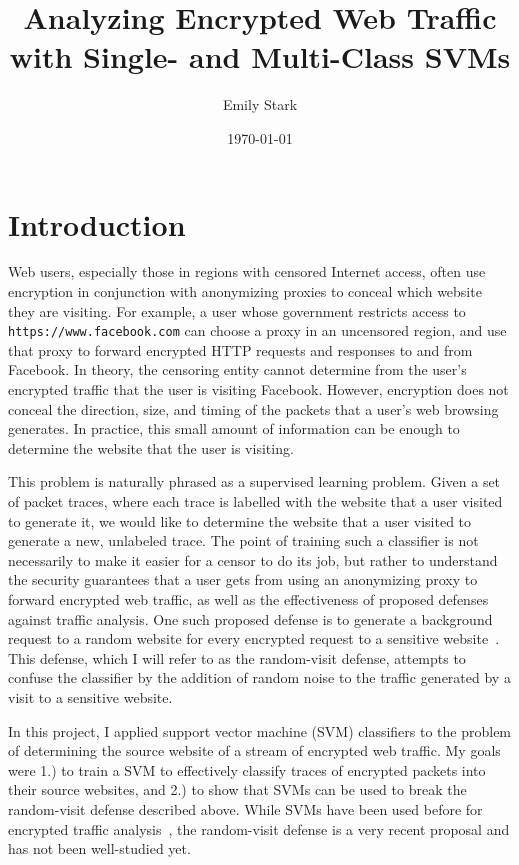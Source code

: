 \documentclass[10pt, twocolumn]{article}
\title{Analyzing Encrypted Web Traffic with Single- and Multi-Class SVMs}
\author{Emily Stark}
\date{\today}                                          %
\begin{document}
\maketitle

\section{Introduction}
Web users, especially those in regions with censored 
Internet access, often use encryption in conjunction 
with anonymizing proxies to conceal which website 
they are visiting. For example, a user whose government 
restricts access to \texttt{https://www.facebook.com} can choose a 
proxy in an uncensored region, and use that proxy to 
forward encrypted HTTP requests and responses to and 
from Facebook. In theory, the censoring entity cannot determine from 
the user's encrypted traffic that the user is visiting 
Facebook. However, encryption does not conceal the direction, 
size, and timing of the packets that a user's web browsing 
generates. In practice, this small amount of information can 
be enough to determine the website that the user is visiting.

This problem is naturally phrased as a supervised learning 
problem. Given a set of packet traces, where each trace is labelled 
with the website that a user visited to generate it, we would 
like to determine the website that a user visited to generate a new, 
unlabeled trace. The point of training such a classifier is not 
necessarily to make it easier for a censor to do its job, but rather 
to understand the security guarantees that a user gets from using 
an anonymizing proxy to forward encrypted web traffic, as well as 
the effectiveness of proposed defenses against traffic analysis. 
One such proposed defense is to generate a background request to a 
random website for every encrypted request to a sensitive website~\cite{torfingerprinting}. 
This defense, which I will refer to as the random-visit defense, 
attempts to confuse the classifier by the addition of random 
noise to the traffic generated by a visit to a sensitive website.

In this project, I applied support vector machine (SVM) classifiers 
to the problem of determining the source website of a stream of 
encrypted web traffic. My goals were 1.) to train a SVM to 
effectively classify traces of encrypted packets into their source 
websites, and 2.) to show that SVMs can be used to break the random-visit 
defense described above. While SVMs have been used before for 
encrypted traffic analysis~\cite{SOMETHING}, the random-visit defense 
is a very recent proposal and has not been well-studied yet.
\end{document}

